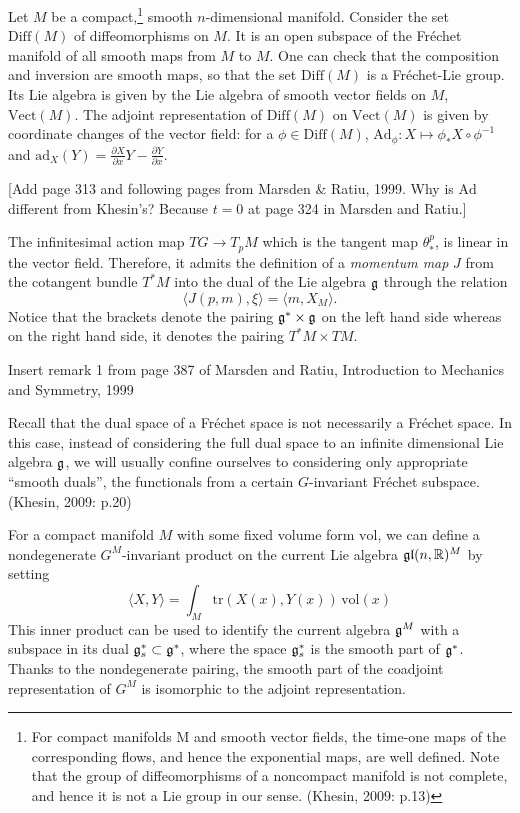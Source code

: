\documentclass{article}
\theoremstyle{plain}
\theoremstyle{definition}
\numberwithin{equation}{section}
\newcommand{\R}{\ensuremath{\mathbb{R}}}
\newcommand{\Diff}{\ensuremath{\mathrm{Diff}}}
\newcommand{\Vol}{\ensuremath{\mathrm{vol}}}
\newcommand{\Vect}{\ensuremath{\mathrm{Vect}}}
\newcommand{\Ad}{\ensuremath{\mathrm{Ad}}}
\newcommand{\ad}{\ensuremath{\mathrm{ad}}}
\newcommand{\tr}{\ensuremath{\mathrm{tr}}}
\newcommand{\mf}{\ensuremath{\mathfrak}}
\begin{document}
Let $M$ be a compact,\footnote{For compact manifolds M and smooth vector fields, the time-one maps of the corresponding flows, and hence the exponential maps, are well defined. Note that the group of diffeomorphisms of a noncompact manifold is not complete, and hence it is not a Lie group in our sense. (Khesin, 2009: p.13)} 
smooth $n$-dimensional manifold. Consider the
set $\Diff(M)$ of diffeomorphisms on $M$. It is an open subspace of the Fréchet
manifold of all smooth maps from $M$ to $M$. One can check that the composition
and inversion are smooth maps, so that the set $\Diff(M)$ is a Fréchet-Lie group. Its Lie algebra is given by the Lie algebra of smooth vector fields on $M$, $\Vect(M)$. The adjoint representation of $\Diff(M)$ on $\Vect(M)$ is given by coordinate changes of the vector field: for a $\phi\in\Diff(M)$, $\Ad_\phi:X\mapsto \phi_*X\circ \phi^{-1}$ and $\ad_X(Y)=\frac{\partial X}{\partial x}Y-\frac{\partial Y}{\partial x}$.



[Add page 313 and following pages from Marsden \& Ratiu, 1999. Why is $\Ad$ different from Khesin's? Because $t=0$ at page 324 in Marsden and Ratiu.]

The infinitesimal action map $TG\to T_pM$ which is the tangent map $\theta^p_*$, is linear in the vector field. Therefore, it admits the definition of a \textit{momentum map} $J$ from the cotangent bundle $T^*M$ into the dual of the Lie algebra $\mf g$ through the relation
\[
\langle J(p,m),\xi\rangle = \langle m,X_M\rangle.
\]
Notice that the brackets denote the pairing $\mf g^*\times\mf g$ on the left hand side whereas on the right hand side, it denotes the pairing $T^*M\times TM$.

Insert remark 1 from page 387 of Marsden and Ratiu, Introduction to Mechanics and Symmetry, 1999



Recall that the dual space of a Fréchet space is not necessarily a Fréchet space. In this case, instead of considering the full dual space to an infinite dimensional Lie algebra $\mf g$, we will usually confine ourselves to considering only appropriate ``smooth duals'', the functionals from a certain $G$-invariant Fréchet subspace. (Khesin, 2009: p.20)

For a compact manifold $M$ with some fixed volume form $\Vol$, we can
define a nondegenerate $G^M$-invariant product on the current Lie algebra $\mf g\mf l(n,\R)^M$ by setting
\[
\langle X,Y\rangle = \int_M\tr(X(x),Y(x))\,\Vol(x)
\]
This inner product can be used to identify the current algebra $\mf g^M$ with a subspace in its dual $\mf g_s^*\subset \mf g^*$, where the space $\mf g_s^*$ is the smooth part of $\mf g^*$. Thanks to the nondegenerate pairing, the smooth part of the coadjoint representation of $G^M$ is isomorphic to the adjoint representation.
\end{document}
